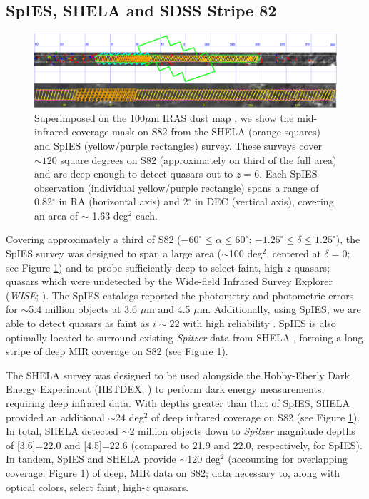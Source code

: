 \documentclass[apj, numberedappendix]{emulateapj}
\begin{document}
\subsection{SpIES, SHELA and SDSS Stripe 82}

\begin{figure}[ht!]
  \centering
  \includegraphics[trim = 0 0 0 225, clip, width = \textwidth]{./New_Plots/S82_surveys.pdf}
  \caption{\footnotesize{Superimposed on the 100$\mu$m IRAS dust map \citep{Schlegel1998}, we show the mid-infrared coverage mask on S82 from the SHELA (orange squares) and SpIES (yellow/purple rectangles) survey. These surveys cover $\sim 120$ square degrees on S82 (approximately on third of the full area) and are deep enough to detect quasars out to $z = 6$. Each SpIES observation (individual yellow/purple rectangle) spans a range of 0.82$^{\circ}$ in RA (horizontal axis) and 2$^{\circ}$ in DEC (vertical axis), covering an area of $\sim$ 1.63 deg$^{2}$ each.}}
  \label{fig:S82_footprint}
\end{figure}

Covering approximately a third of S82 ($-60^{\circ} \leq \alpha \leq60^{\circ}$; $-1.25^{\circ} \leq \delta \leq 1.25^{\circ}$), the SpIES survey was designed to span a large area ($\sim$100 deg$^2$, centered at $\delta = 0$; see Figure \ref{fig:S82_footprint}) and to probe sufficiently deep to select faint, high-$z$ quasars; quasars which were undetected by the Wide-field Infrared Survey Explorer (\emph{WISE}; \citealt{Wright2010}). The SpIES catalogs reported the photometry and photometric errors for $\sim$5.4 million objects at 3.6 $\mu$m and 4.5 $\mu$m. Additionally, using SpIES, we are able to detect quasars as faint as $i \sim 22$ with high reliability \citep{Timlin2016}. SpIES is also optimally located to surround existing \emph{Spitzer} data from SHELA \citep{Papovich2016}, forming a long stripe of deep MIR coverage on S82 (see Figure \ref{fig:S82_footprint}).

The SHELA survey was designed to be used alongside the Hobby-Eberly Dark Energy Experiment (HETDEX; \citealt{Hill2008}) to perform dark energy measurements, requiring deep infrared data. With depths greater than that of SpIES, SHELA provided an additional $\sim$24 deg$^{2}$ of deep infrared coverage on S82 (see Figure \ref{fig:S82_footprint}). In total, SHELA detected $\sim$2 million objects down to \emph{Spitzer} magnitude depths of [3.6]=22.0 and [4.5]=22.6 (compared to 21.9 and 22.0, respectively, for SpIES). In tandem, SpIES and SHELA provide $\sim$120 deg$^{2}$ (accounting for overlapping coverage: Figure \ref{fig:S82_footprint}) of deep, MIR data on S82; data necessary to, along with optical colors, select faint, high-$z$ quasars.
\end{document}
